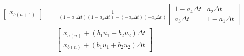 \documentclass[11pt]{article}
\begin{document}
\begin{subequations}
\begin{align}
\begin{bmatrix}
      x_{b(n+1)}
    \end{bmatrix} &=
    \frac{1}{(1 - a_1\Delta t)(1 - a_4\Delta t) -(- a_2\Delta t)(- a_3\Delta t) }
    \begin{bmatrix}
      1 - a_4\Delta t & a_2\Delta t \\
      a_3\Delta t & 1 - a_1\Delta t
    \end{bmatrix} \\ \nonumber
    &\quad
    \begin{bmatrix}
      x_{a(n)} + (b_1 u_1 + b_2 u_2)\Delta t \\
      x_{b(n)} + (b_1 u_1 + b_2 u_2)\Delta t
    \end{bmatrix} \\
  \end{align}
\end{subequations}
\end{document}
